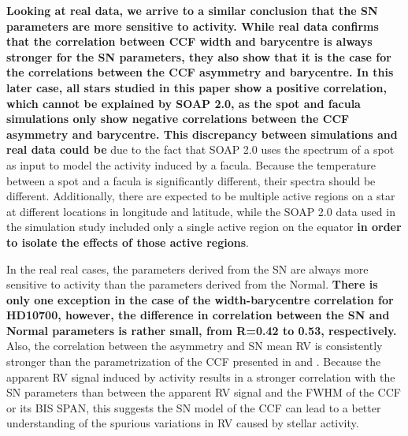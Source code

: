 \documentclass{aa}
\newcommand{\jessi}[1]{{\color{Purple}[[\textbf{Jessi: }#1]]}}
\newcommand{\xavier}[1]{{\color{blue}[[\textbf{Xavier: }#1]]}}
\newcommand{\umberto}[1]{{\color{green}[[\textbf{Umberto: }#1]]}}
\begin{document}
{\bf Looking at real data, we arrive to a similar conclusion that the SN parameters are more sensitive to activity. While real data confirms that the correlation between CCF width and barycentre is always stronger for the SN parameters, they also show that it is the case for the correlations between the CCF asymmetry and barycentre. In this later case, all stars studied in this paper show a positive correlation, which cannot be explained by SOAP 2.0, as the spot and facula simulations only show negative correlations between the CCF asymmetry and barycentre. This discrepancy between simulations and real data could be} due to the fact that SOAP 2.0 uses the spectrum of a spot as input to model the activity induced by a facula.
Because the temperature between a spot and a facula is significantly different, their spectra should be different. 
Additionally, there are expected to be multiple active regions on a star at different locations in longitude and latitude, while the SOAP 2.0 data used in the simulation study included only a single active region on the equator {\bf in order to isolate the effects of those active regions}. 

In the real real cases, the parameters derived from the SN are always more sensitive to activity than the parameters derived from the Normal.  
{\bf There is only one exception in the case of the width-barycentre correlation for HD10700, however, the difference in correlation between the SN and Normal parameters is rather small, from R=0.42 to 0.53, respectively.}
Also, the correlation between the asymmetry and SN mean RV is consistently stronger than the parametrization of the CCF presented in \citet{Boisse-2011} and \citet{Figueira-2013}. 
Because the apparent RV signal induced by activity  
results in a stronger correlation with the SN parameters
than between the apparent RV signal and the FWHM of the CCF or its BIS SPAN, this suggests the SN model of the CCF can lead to a better understanding of the spurious variations in RV caused by stellar activity.
\end{document}
